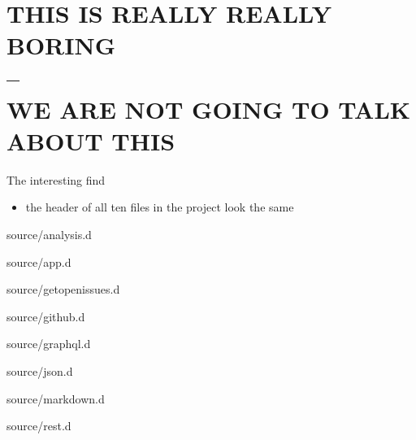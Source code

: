 \documentclass[aspectratio=169,notes]{beamer}
\begin{document}
	\section{THIS IS REALLY REALLY BORING\\ --\\ WE ARE NOT GOING TO TALK ABOUT THIS}

	\begin{frame}[fragile]{The interesting find}
		\begin{itemize}
			\item the header of all ten files in the project look the same
		\end{itemize}
	\end{frame}
	\begin{frame}[fragile]{source/analysis.d}
		
	\end{frame}
	\begin{frame}[fragile]{source/app.d}
		
	\end{frame}
	\begin{frame}[fragile]{source/getopenissues.d}
		
	\end{frame}
	\begin{frame}[fragile]{source/github.d}
		
	\end{frame}
	\begin{frame}[fragile]{source/graphql.d}
		
	\end{frame}
	\begin{frame}[fragile]{source/json.d}
		
	\end{frame}
	\begin{frame}[fragile]{source/markdown.d}
		
	\end{frame}
	\begin{frame}[fragile]{source/rest.d}
		
	\end{frame}
\end{document}

